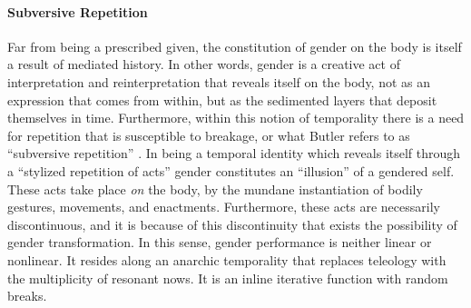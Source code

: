 \paragraph{Subversive Repetition}
Far from being a prescribed given, the constitution of gender on the body is itself a result of mediated history. In other words, gender is a creative act of interpretation and reinterpretation that reveals itself on the body, not as an expression that comes from within, but as the sedimented layers that deposit themselves in time. Furthermore, within this notion of temporality there is a need for repetition that is susceptible to breakage, or what Butler refers to as ``subversive repetition'' \parencite[520]{But88:Per}. In being a temporal identity which reveals itself through a ``stylized repetition of acts'' gender constitutes an ``illusion'' of a gendered self. These acts take place \textit{on} the body, by the mundane instantiation of bodily gestures, movements, and enactments. Furthermore, these acts are necessarily discontinuous, and it is because of this discontinuity that exists the possibility of gender transformation. In this sense, gender performance is neither linear or nonlinear. It resides along an anarchic temporality that replaces teleology with the multiplicity of resonant nows. It is an inline iterative function with random breaks. 


